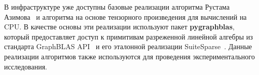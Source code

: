 В инфраструктуре уже доступны базовые реализации алгоритма Рустама Азимова~\cite{inproceedings:matrix_cfpq} и алгоритма на основе тензорного произведения для вычислений на CPU. 
В качестве основы эти реализации используют пакет \textbf{pygraphblas}, который предоставляет доступ к примитивам разреженной линейной алгебры из стандарта GraphBLAS API~\cite{paper:graphblas_foundations} и его эталонной реализации SuiteSparse~\cite{article:suite_sparse_for_graph_problems}. 
Данные реализации алгоритмов также используются для проведения экспериментального исследования.





